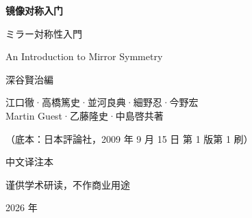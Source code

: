 \begin{titlepage}
\centering
\vspace*{2.6cm}
{\Huge\bfseries 镜\quad 像\quad 对\quad 称\quad 入\quad 门\par}
\vspace{1.0cm}
{\Large ミラー対称性入門\par}
\vspace{0.5cm}
{\large An Introduction to Mirror Symmetry\par}
\vspace{2.0cm}
{\Large 深谷賢治\quad 編\par}
\vspace{0.5cm}
{\small 江口徹·高橋篤史·並河良典·細野忍·今野宏\\[2pt]
Martin Guest·乙藤隆史·中島啓\quad 共著\par}
\vspace{0.8cm}
{\large （底本：日本評論社，2009 年 9 月 15 日 第 1 版第 1 刷）\par}
\vspace{2.2cm}
{\LARGE 中\quad 文\quad 译\quad 注\quad 本\par}
\vspace{1.0cm}
{\large 谨供学术研读，不作商业用途\par}
\vfill
{\large 2026 年\par}
\end{titlepage}
